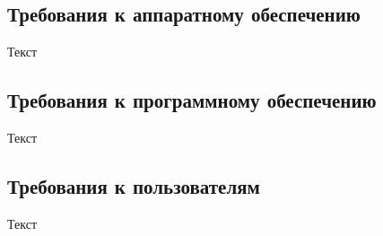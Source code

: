 \documentclass[../document.tex]{subfiles}
\begin{document}
\subsection{Требования к аппаратному обеспечению}
\par Текст
\subsection{Требования к программному обеспечению}
\par Текст
\subsection{Требования к пользователям}
\par Текст
\end{document}
